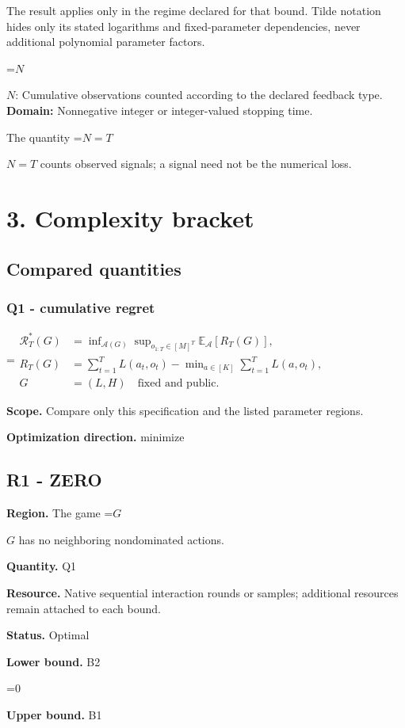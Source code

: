 \documentclass[10pt,a4paper]{article}
\newcommand{\AtlasMath}[1]{\par\begingroup\centering\setbox0=\hbox{$\displaystyle #1$}\ifdim\wd0>1.4\linewidth\typeout{ATLAS WIDE FORMULA: \the\wd0}\fi\ifdim\wd0>\linewidth\resizebox{\linewidth}{!}{\box0}\else\box0\fi\par\endgroup}
\newcommand{\AtlasInlineMath}[1]{\begingroup\setbox0=\hbox{$#1$}\ifdim\wd0>.4\linewidth\endgroup\AtlasMath{#1}\else\endgroup$#1$\fi}
\begin{document}
The result applies only in the regime declared for that bound. Tilde notation hides only its stated logarithms and fixed-parameter dependencies, never additional polynomial parameter factors.

\AtlasInlineMath{N}: Cumulative observations counted according to the declared feedback type. \textbf{Domain:} Nonnegative integer or integer-valued stopping time.

The quantity \AtlasInlineMath{N=T} counts observed signals; a signal need not be the numerical loss.

\section{3. Complexity bracket}
\subsection{Compared quantities}
\subsubsection{Q1 - cumulative regret}
\AtlasMath{\begin{aligned}\mathcal R_T^*(G)&=\inf_{\mathcal A(G)}\sup_{o_{1:T}\in[M]^T}\mathbb E_{\mathcal A}[R_T(G)],\\ R_T(G)&=\sum_{t=1}^T L(a_t,o_t)-\min_{a\in[K]}\sum_{t=1}^T L(a,o_t),\\ G&=(L,H)\quad\text{fixed and public}.\end{aligned}}
\textbf{Scope.} Compare only this specification and the listed parameter regions.

\textbf{Optimization direction.} minimize

\subsection{R1 - ZERO}
\textbf{Region.} The game \AtlasInlineMath{G} has no neighboring nondominated actions.

\textbf{Quantity.} Q1

\textbf{Resource.} Native sequential interaction rounds or samples; additional resources remain attached to each bound.

\textbf{Status.} Optimal

\textbf{Lower bound.} B2

\AtlasMath{0}
\textbf{Upper bound.} B1
\end{document}
